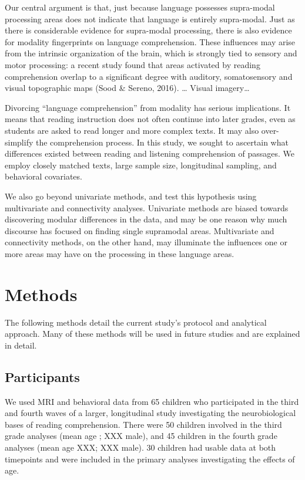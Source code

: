 Our central argument is that, just because language possesses supra-modal processing areas does not indicate that language is entirely supra-modal. Just as there is considerable evidence for supra-modal processing, there is also evidence for modality fingerprints on language comprehension. These influences may arise from the intrinsic organization of the brain, which is strongly tied to sensory and motor processing: a recent study found that areas activated by reading comprehension overlap to a significant degree with auditory, somatosensory and visual topographic maps (Sood \& Sereno, 2016). … Visual imagery… 

Divorcing “language comprehension” from modality has serious implications. It means that reading instruction does not often continue into later grades, even as students are asked to read longer and more complex texts. It may also over-simplify the comprehension process. 
In this study, we sought to ascertain what differences existed between reading and listening comprehension of passages. We employ closely matched texts, large sample size, longitudinal sampling, and behavioral covariates. 

We also go beyond univariate methods, and test this hypothesis using multivariate and connectivity analyses. Univariate methods are biased towards discovering modular differences in the data, and may be one reason why much discourse has focused on finding single supramodal areas. Multivariate and connectivity methods, on the other hand, may illuminate the influences one or more areas may have on the processing in these language areas. 


\section{Methods}

The following methods detail the current study's protocol and analytical approach. Many of these methods will be used in future studies and are explained in detail. 

\subsection{Participants}

We used MRI and behavioral data from 65 children who participated in the third and fourth waves of a larger, longitudinal study investigating the neurobiological bases of reading comprehension. There were 50 children involved in the third grade analyses (mean age ; XXX male), and 45 children in the fourth grade analyses (mean age XXX; XXX male). 30 children had usable data at both timepoints and were included in the primary analyses investigating the effects of age.

